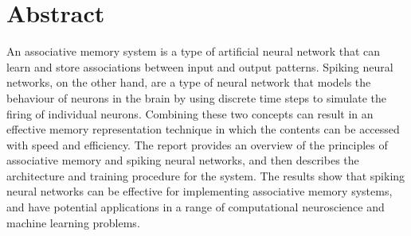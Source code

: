 \chapter*{\centering Abstract}%
\begin{center}
\end{center}

An associative memory system is a type of artificial neural network that can
learn and store associations between input and output patterns. Spiking neural
networks, on the other hand, are a type of neural network that models the
behaviour of neurons in the brain by using discrete time steps to simulate the
firing of individual neurons. Combining these two concepts can result in an
effective memory representation technique in which the contents can be accessed
with speed and efficiency. The report provides an overview of the principles of
associative memory and spiking neural networks, and then describes the
architecture and training procedure for the system. The results show that
spiking neural networks can be effective for implementing associative memory
systems, and have potential applications in a range of computational
neuroscience and machine learning problems.

\begin{flushright}

\end{flushright}

\thispagestyle{plain}